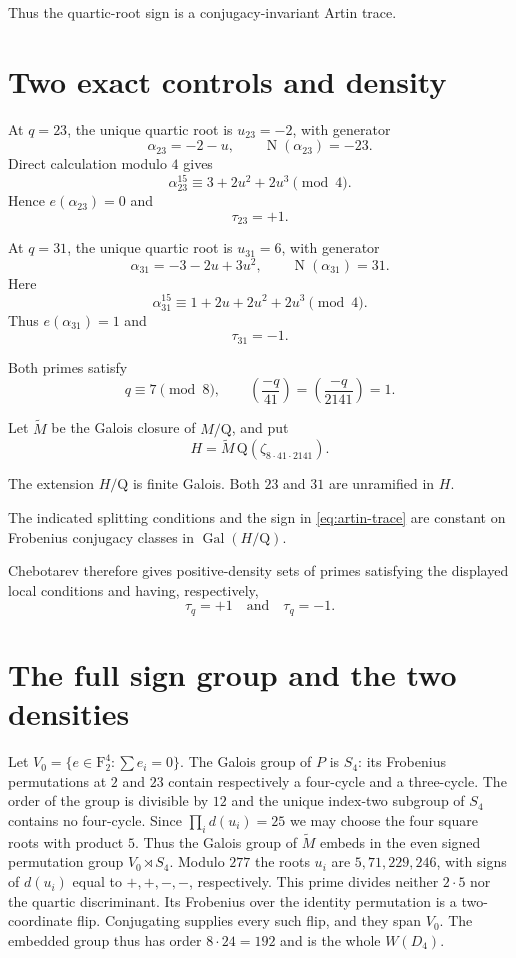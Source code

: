 \documentclass[11pt]{article}
\newcommand{\Q}{\mathrm Q}
\newcommand{\F}{\mathrm F}
\newcommand{\Nm}{\operatorname{N}}
\begin{document}
Thus the quartic-root sign is a
conjugacy-invariant Artin trace.

\section{Two exact controls and density}

At $q=23$, the unique quartic root is
$u_{23}=-2$, with generator
\[
\alpha_{23}=-2-u,\qquad
\Nm(\alpha_{23})=-23.
\]
Direct calculation modulo $4$ gives
\[
\alpha_{23}^{15}
\equiv3+2u^2+2u^3\pmod4.
\]
Hence $e(\alpha_{23})=0$ and
\[
\tau_{23}=+1.
\]

At $q=31$, the unique quartic root is
$u_{31}=6$, with generator
\[
\alpha_{31}=-3-2u+3u^2,\qquad
\Nm(\alpha_{31})=31.
\]
Here
\[
\alpha_{31}^{15}
\equiv1+2u+2u^2+2u^3\pmod4.
\]
Thus $e(\alpha_{31})=1$ and
\[
\tau_{31}=-1.
\]

Both primes satisfy
\[
q\equiv7\pmod8,\qquad
\left(\frac{-q}{41}\right)
=\left(\frac{-q}{2141}\right)=1.
\]

Let $\widetilde M$ be the Galois
closure of $M/\Q$, and put
\[
H=\widetilde M\,
\Q(\zeta_{8\cdot41\cdot2141}).
\]

The extension $H/\Q$ is finite Galois.
Both $23$ and $31$ are unramified in $H$.

The indicated splitting conditions
and the sign in
\eqref{eq:artin-trace}
are constant on Frobenius conjugacy
classes in $\operatorname{Gal}(H/\Q)$.

Chebotarev therefore gives
positive-density sets of primes
satisfying the displayed local
conditions and having, respectively,
\[
\tau_q=+1
\quad\text{and}\quad
\tau_q=-1.
\]

\section{The full sign group and the two densities}

Let $V_0=\{e\in\F_2^4:\sum e_i=0\}$. The Galois group of $P$ is
$S_4$: its Frobenius permutations at $2$ and $23$ contain respectively
a four-cycle and a three-cycle. The order of the group is divisible
by $12$ and the unique index-two subgroup of $S_4$ contains no
four-cycle. Since $\prod_i d(u_i)=25$ we may choose the four square
roots with product $5$. Thus the Galois group of $\widetilde M$ embeds
in the even signed permutation group $V_0\rtimes S_4$. Modulo $277$
the roots $u_i$ are $5,71,229,246$, with signs of $d(u_i)$ equal to
$+,+,-,-$, respectively. This prime divides neither $2\cdot 5$ nor the
quartic discriminant. Its Frobenius over the identity permutation is
a two-coordinate flip. Conjugating supplies every such flip, and
they span $V_0$. The embedded group thus has order $8\cdot24=192$
and is the whole $W(D_4)$.
\end{document}
